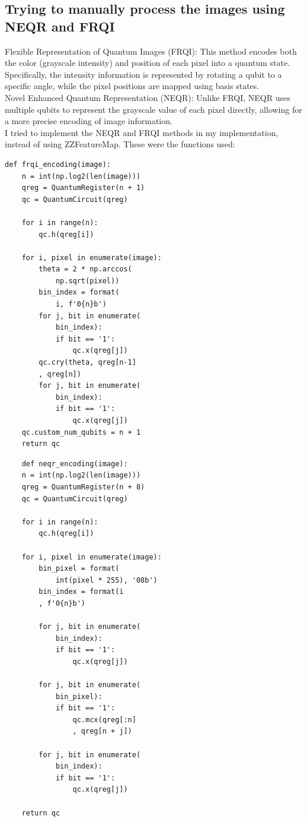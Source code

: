 \documentclass[conference]{IEEEtran}
\begin{document}
\subsection*{\fontsize{12}{16}\selectfont Trying to manually process the images using NEQR and FRQI}
\label {sec:NEQR_FRQI}

Flexible Representation of Quantum Images (FRQI): This method encodes both the color (grayscale intensity) and position of each pixel into a quantum state. Specifically, the intensity information is represented by rotating a qubit to a specific angle, while the pixel positions are mapped using basis states.\\
Novel Enhanced Quantum Representation (NEQR): Unlike FRQI, NEQR uses multiple qubits to represent the grayscale value of each pixel directly, allowing for a more precise encoding of image information.\\
I tried to implement the NEQR and FRQI methods in my implementation, instead of using ZZFeatureMap.
These were the functions used:

{\small
\begin{verbatim}
def frqi_encoding(image):
    n = int(np.log2(len(image)))  
    qreg = QuantumRegister(n + 1)  
    qc = QuantumCircuit(qreg)
    
    for i in range(n):
        qc.h(qreg[i])
    
    for i, pixel in enumerate(image):
        theta = 2 * np.arccos(
            np.sqrt(pixel))
        bin_index = format(
            i, f'0{n}b')
        for j, bit in enumerate(
            bin_index):
            if bit == '1':
                qc.x(qreg[j])
        qc.cry(theta, qreg[n-1]
        , qreg[n])
        for j, bit in enumerate(
            bin_index):
            if bit == '1':
                qc.x(qreg[j])
    qc.custom_num_qubits = n + 1
    return qc
\end{verbatim}
}



{\small
\begin{verbatim}
    def neqr_encoding(image):
    n = int(np.log2(len(image)))
    qreg = QuantumRegister(n + 8) 
    qc = QuantumCircuit(qreg)
    
    for i in range(n):
        qc.h(qreg[i])
    
    for i, pixel in enumerate(image):
        bin_pixel = format(
            int(pixel * 255), '08b')
        bin_index = format(i
        , f'0{n}b')
        
        for j, bit in enumerate(
            bin_index):
            if bit == '1':
                qc.x(qreg[j])
        
        for j, bit in enumerate(
            bin_pixel):
            if bit == '1':
                qc.mcx(qreg[:n]
                , qreg[n + j])
        
        for j, bit in enumerate(
            bin_index):
            if bit == '1':
                qc.x(qreg[j])
    
    return qc
\end{verbatim}
}
\end{document}
